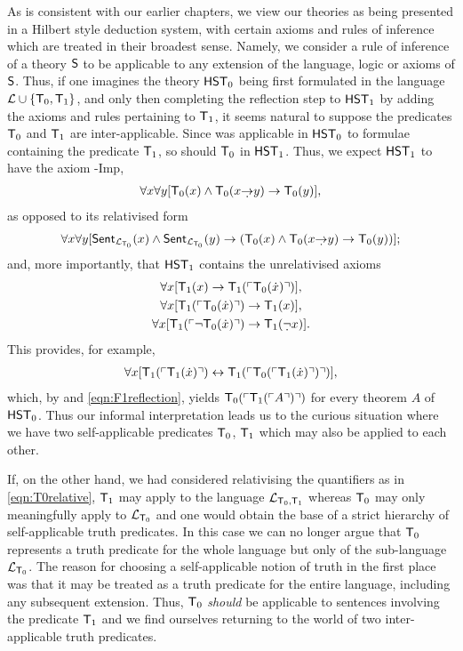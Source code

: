 \documentclass[UKenglish,cleveref,DIV=12]{scrartcl}
\theoremstyle{definition}
\theoremstyle{definition}
\begin{document}
As is consistent with our earlier chapters, we view our theories as being
presented in a Hilbert style deduction system, with certain axioms and rules of inference which
are treated in their broadest sense. Namely, we consider a rule of inference of a
theory $\mathsf{S}$ to be applicable to any extension of the language, logic or
axioms of $\mathsf{S}$. Thus, if one imagines the theory $\mathsf{HST}_0$ being first
formulated in the language $\mathcal{L}\cup\{\mathsf{T}_0,\mathsf{T}_1\}$, and only then completing
the reflection step to $\mathsf{HST}_1$ by adding the axioms and rules pertaining to
$\mathsf{T}_1$, it seems natural to suppose the predicates $\mathsf{T}_0$ and $\mathsf{T}_1$ are
inter-applicable. Since  was applicable in $\mathsf{HST}_0$ to formulae
containing the predicate $\mathsf{T}_1$, so should $\mathsf{T}_0$ in $\mathsf{HST}_1$. Thus, we expect
$\mathsf{HST}_1$ to have the axiom -Imp,
\begin{align*}
  \forall x\forall y[ \T_0(x)\land \T_0(x\dimplies y)\rightarrow \T_0(y)],
\end{align*}
as opposed to its relativised form
\begin{align}\label{eqn:T0relative}
  \forall x\forall y[\Sent_{\L_{\T_0}}(x)\land\Sent_{\L_{\T_0}}(y)\rightarrow ( \T_0(x)\land \T_0(x\dimplies y)\rightarrow \T_0(y))];
\end{align}
and, more importantly, that $\mathsf{HST}_1$ contains the unrelativised axioms
\begin{gather}
  \forall x[\T_1(x)\rightarrow \T_1(\gn{\T_0(\dot x)})],\nonumber\\
  \forall x[\T_1(\gn{\T_0(\dot x)})\rightarrow \T_1(x)],\label{eqn:F1ax1}\\
  \forall x[\T_1(\gn{\lnot \T_0(\dot x)})\rightarrow \T_1(\dlnot x)].\nonumber
\end{gather}
This provides, for example,
\begin{align*}
  \forall x[\mathsf{T}_1(\ulcorner{\mathsf{T}_1(\dot x)}\urcorner)\leftrightarrow \mathsf{T}_1(\ulcorner{\mathsf{T}_0(\ulcorner{\mathsf{T}_1(\dot x)}\urcorner)}\urcorner)],
\end{align*}
which, by  and \eqref{eqn:F1reflection}, yields
$\mathsf{T}_0(\ulcorner{\mathsf{T}_1(\ulcorner{A}\urcorner)}\urcorner)$ for every theorem $A$ of $\mathsf{HST}_0$. Thus our informal
interpretation leads us to the curious situation where we have two
self-applicable predicates $\mathsf{T}_0$, $\mathsf{T}_1$ which may also be applied to each other.

If, on the other hand, we had considered relativising the quantifiers as in \eqref{eqn:T0relative},
$\mathsf{T}_1$ may apply to the language $\mathcal{L}_{\mathsf{T}_0,\mathsf{T}_1}$ whereas $\mathsf{T}_0$ may only
meaningfully apply to $\mathcal{L}_{\mathsf{T}_0}$ and one would obtain the base of a strict
hierarchy of self-applicable truth predicates. In this case we can no longer
argue that $\mathsf{T}_0$ represents a truth predicate for the whole language but only of
the sub-language $\mathcal{L}_{\mathsf{T}_0}$. The reason for choosing a self-applicable
notion of truth in the first place was that it may be treated as a truth
predicate for the entire language, including any subsequent extension. Thus,
$\mathsf{T}_0$ \emph{should} be applicable to sentences involving the predicate $\mathsf{T}_1$ and
we find ourselves returning to the world of two inter-applicable truth
predicates.
\end{document}

